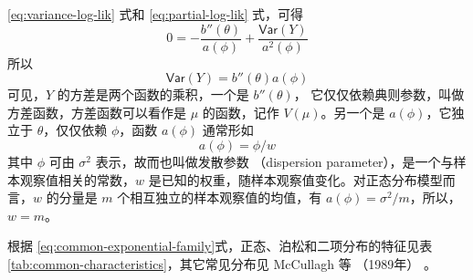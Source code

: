 \documentclass[12pt,a4paper,UTF8,twoside]{book}
\theoremstyle{definition}
\theoremstyle{definition}
\theoremstyle{definition}
\theoremstyle{remark}
\begin{document}
\eqref{eq:variance-log-lik} 式和 \eqref{eq:partial-log-lik} 式，可得
\[ 0 = - \frac{b''(\theta)}{a(\phi)} + \frac{\mathsf{Var}(Y)}{a^2(\phi)} \]
\noindent 所以 \[ \mathsf{Var}(Y) = b''(\theta)a(\phi) \] 可见，\(Y\)
的方差是两个函数的乘积，一个是 \(b''(\theta)\)，
它仅仅依赖典则参数，叫做方差函数，方差函数可以看作是 \(\mu\)
的函数，记作 \(V(\mu)\)。另一个是 \(a(\phi)\)，它独立于
\(\theta\)，仅仅依赖 \(\phi\)，函数 \(a(\phi)\) 通常形如
\[ a(\phi) = \phi/w \] \noindent 其中 \(\phi\) 可由 \(\sigma^2\)
表示，故而也叫做发散参数 （dispersion
parameter），是一个与样本观察值相关的常数，\(w\)
是已知的权重，随样本观察值变化。对正态分布模型而言，\(w\) 的分量是 \(m\)
个相互独立的样本观察值的均值，有
\(a(\phi) = \sigma^2/m\)，所以，\(w = m\)。

根据
\eqref{eq:common-exponential-family}式，正态、泊松和二项分布的特征见表
\ref{tab:common-characteristics}，其它常见分布见 McCullagh 等 （1989年）
\citep{McCullagh1989}。
\end{document}
